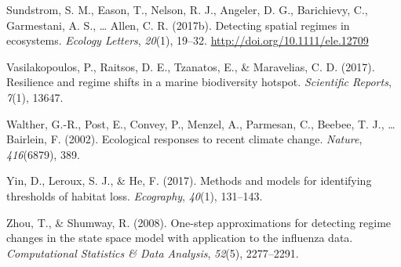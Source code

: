 \documentclass[12pt,twoside,openany]{reedthesis}
\begin{document}
\hypertarget{ref-sundstrom2017detecting}{}
Sundstrom, S. M., Eason, T., Nelson, R. J., Angeler, D. G., Barichievy,
C., Garmestani, A. S., \ldots{} Allen, C. R. (2017b). Detecting spatial
regimes in ecosystems. \emph{Ecology Letters}, \emph{20}(1), 19--32.
\url{http://doi.org/10.1111/ele.12709}

\hypertarget{ref-vasilakopoulos2017resilience}{}
Vasilakopoulos, P., Raitsos, D. E., Tzanatos, E., \& Maravelias, C. D.
(2017). Resilience and regime shifts in a marine biodiversity hotspot.
\emph{Scientific Reports}, \emph{7}(1), 13647.

\hypertarget{ref-walther_ecological_2002}{}
Walther, G.-R., Post, E., Convey, P., Menzel, A., Parmesan, C., Beebee,
T. J., \ldots{} Bairlein, F. (2002). Ecological responses to recent
climate change. \emph{Nature}, \emph{416}(6879), 389.

\hypertarget{ref-yin2017methods}{}
Yin, D., Leroux, S. J., \& He, F. (2017). Methods and models for
identifying thresholds of habitat loss. \emph{Ecography}, \emph{40}(1),
131--143.

\hypertarget{ref-zhou2008one}{}
Zhou, T., \& Shumway, R. (2008). One-step approximations for detecting
regime changes in the state space model with application to the
influenza data. \emph{Computational Statistics \& Data Analysis},
\emph{52}(5), 2277--2291.
\end{document}
